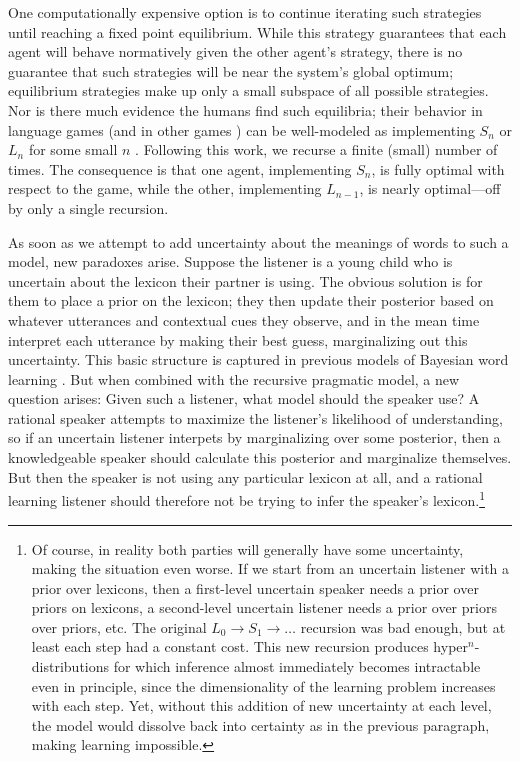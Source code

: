 \documentclass{article} %
\begin{document}
One computationally expensive option is to continue iterating such
strategies until reaching a fixed point equilibrium. While this
strategy guarantees that each agent will behave normatively given the
other agent's strategy, there is no guarantee that such strategies
will be near the system's global optimum; equilibrium strategies make
up only a small subspace of all possible strategies. Nor is there much
evidence the humans find such equilibria; their behavior in language
games (and in other games \cite{camerer2004}) can be well-modeled as
implementing $S_n$ or $L_n$ for some small $n$
\cite{frank2012}. Following this work, we recurse a finite (small)
number of times. The consequence is that one agent, implementing
$S_n$, is fully optimal with respect to the game, while the other,
implementing $L_{n-1}$, is nearly optimal---off by only a single
recursion.

As soon as we attempt to add uncertainty about the meanings of words
to such a model, new paradoxes arise. Suppose the listener is a young
child who is uncertain about the lexicon their partner is using. The
obvious solution is for them to place a prior on the lexicon; they
then update their posterior based on whatever utterances and
contextual cues they observe, and in the mean time interpret each
utterance by making their best guess, marginalizing out this
uncertainty. This basic structure is captured in previous models of
Bayesian word learning \cite{frank2009}. But when combined with the
recursive pragmatic model, a new question arises: Given such a
listener, what model should the speaker use? A rational speaker
attempts to maximize the listener's likelihood of understanding, so if
an uncertain listener interpets by marginalizing over some posterior,
then a knowledgeable speaker should calculate this posterior and
marginalize themselves. But then the speaker is not using any
particular lexicon at all, and a rational learning listener should
therefore not be trying to infer the speaker's lexicon.\footnote{Of
  course, in reality both parties will generally have some
  uncertainty, making the situation even worse. If we start from an
  uncertain listener with a prior over lexicons, then a first-level
  uncertain speaker needs a prior over priors on lexicons, a
  second-level uncertain listener needs a prior over priors over
  priors, etc. The original $L_0 \rightarrow S_1 \rightarrow \dots$
  recursion was bad enough, but at least each step had a constant
  cost. This new recursion produces hyper$^n$-distributions for which
  inference almost immediately becomes intractable even in principle,
  since the dimensionality of the learning problem increases with each
  step. Yet, without this addition of new uncertainty at each level,
  the model would dissolve back into certainty as in the previous
  paragraph, making learning
  impossible.}
\end{document}
